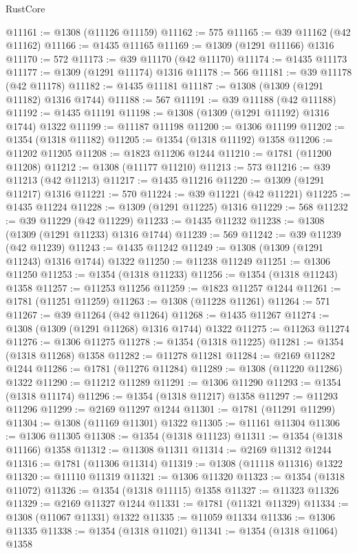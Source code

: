\begin{lexlean}{RustCore}
\begin{coremodule}
@11161 := @1308 (@11126 @11159)
@11162 := 575
@11165 := @39 @11162 (@42 @11162)
@11166 := @1435 @11165
@11169 := @1309 (@1291 @11166) @1316
@11170 := 572
@11173 := @39 @11170 (@42 @11170)
@11174 := @1435 @11173
@11177 := @1309 (@1291 @11174) @1316
@11178 := 566
@11181 := @39 @11178 (@42 @11178)
@11182 := @1435 @11181
@11187 := @1308 (@1309 (@1291 @11182) @1316 @1744)
@11188 := 567
@11191 := @39 @11188 (@42 @11188)
@11192 := @1435 @11191
@11198 := @1308 (@1309 (@1291 @11192) @1316 @1744) @1322
@11199 := @11187 @11198
@11200 := @1306 @11199
@11202 := @1354 (@1318 @11182)
@11205 := @1354 (@1318 @11192) @1358
@11206 := @11202 @11205
@11208 := @1823 @11206 @1244
@11210 := @1781 (@11200 @11208)
@11212 := @1308 (@11177 @11210)
@11213 := 573
@11216 := @39 @11213 (@42 @11213)
@11217 := @1435 @11216
@11220 := @1309 (@1291 @11217) @1316
@11221 := 570
@11224 := @39 @11221 (@42 @11221)
@11225 := @1435 @11224
@11228 := @1309 (@1291 @11225) @1316
@11229 := 568
@11232 := @39 @11229 (@42 @11229)
@11233 := @1435 @11232
@11238 := @1308 (@1309 (@1291 @11233) @1316 @1744)
@11239 := 569
@11242 := @39 @11239 (@42 @11239)
@11243 := @1435 @11242
@11249 := @1308 (@1309 (@1291 @11243) @1316 @1744) @1322
@11250 := @11238 @11249
@11251 := @1306 @11250
@11253 := @1354 (@1318 @11233)
@11256 := @1354 (@1318 @11243) @1358
@11257 := @11253 @11256
@11259 := @1823 @11257 @1244
@11261 := @1781 (@11251 @11259)
@11263 := @1308 (@11228 @11261)
@11264 := 571
@11267 := @39 @11264 (@42 @11264)
@11268 := @1435 @11267
@11274 := @1308 (@1309 (@1291 @11268) @1316 @1744) @1322
@11275 := @11263 @11274
@11276 := @1306 @11275
@11278 := @1354 (@1318 @11225)
@11281 := @1354 (@1318 @11268) @1358
@11282 := @11278 @11281
@11284 := @2169 @11282 @1244
@11286 := @1781 (@11276 @11284)
@11289 := @1308 (@11220 @11286) @1322
@11290 := @11212 @11289
@11291 := @1306 @11290
@11293 := @1354 (@1318 @11174)
@11296 := @1354 (@1318 @11217) @1358
@11297 := @11293 @11296
@11299 := @2169 @11297 @1244
@11301 := @1781 (@11291 @11299)
@11304 := @1308 (@11169 @11301) @1322
@11305 := @11161 @11304
@11306 := @1306 @11305
@11308 := @1354 (@1318 @11123)
@11311 := @1354 (@1318 @11166) @1358
@11312 := @11308 @11311
@11314 := @2169 @11312 @1244
@11316 := @1781 (@11306 @11314)
@11319 := @1308 (@11118 @11316) @1322
@11320 := @11110 @11319
@11321 := @1306 @11320
@11323 := @1354 (@1318 @11072)
@11326 := @1354 (@1318 @11115) @1358
@11327 := @11323 @11326
@11329 := @2169 @11327 @1244
@11331 := @1781 (@11321 @11329)
@11334 := @1308 (@11067 @11331) @1322
@11335 := @11059 @11334
@11336 := @1306 @11335
@11338 := @1354 (@1318 @11021)
@11341 := @1354 (@1318 @11064) @1358

\end{coremodule}
\end{lexlean}
